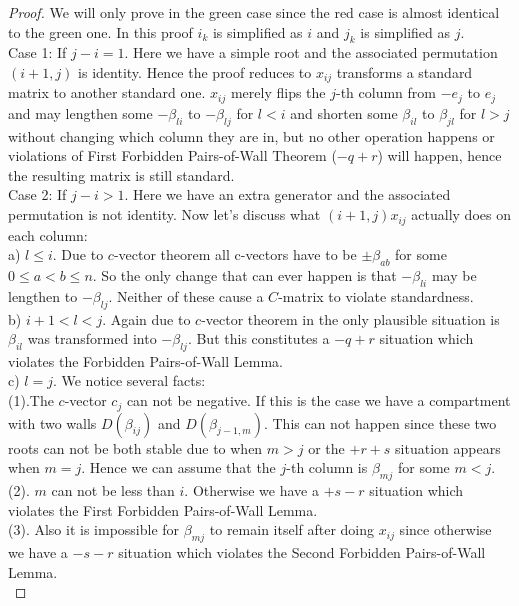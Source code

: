\begin{proof}
\indent We will only prove in the green case since the red case is almost identical to the green one. In this proof $i_k$ is simplified as $i$ and $j_k$ is simplified as $j$.\\
\indent Case 1: If $j - i  = 1$. Here we have a simple root and the associated permutation $(i+1,j)$ is identity. Hence the proof reduces to $x_{ij}$ transforms a standard matrix to another standard one. $x_{ij}$ merely flips the $j$-th column from $-e_j$ to $e_j$ and may lengthen some $-\beta_{li}$ to $-\beta_{lj}$ for $l<i$ and shorten some $\beta_{il}$ to $\beta_{jl}$ for $l>j$ without changing which column they are in, but no other operation happens or violations of First Forbidden Pairs-of-Wall Theorem ($-q+r$) will happen, hence the resulting matrix is still standard.\\
\indent Case 2: If $j - i > 1$. Here we have an extra generator and the associated permutation is not identity. Now let's discuss what $(i+1,j) x_{ij}$ actually does on each column:\\
\indent a) $l\leq i$. Due to $c$-vector theorem \cite{IOTW15} all c-vectors have to be $\pm\beta_{ab}$ for some $0\leq a<b\leq n$. So the only change that can ever happen is that $-\beta_{li}$ may be lengthen to $-\beta_{lj}$. Neither of these cause a $C$-matrix to violate standardness.\\
\indent b) $i + 1 < l < j$. Again due to $c$-vector theorem in \cite{IOTW15} the only plausible situation is $\beta_{il}$ was transformed into $-\beta_{lj}$. But this constitutes a $-q+r$ situation which violates the Forbidden Pairs-of-Wall Lemma.\\
\indent c) $l = j$. We notice several facts:\\
\indent (1).The $c$-vector $c_j$ can not be negative. If this is the case we have a compartment with two walls $D(\beta_{ij})$ and $D(\beta_{j-1,m})$. This can not happen since these two roots can not be both stable due to \cite{ST12} when $m>j$ or the $+r+s$ situation appears when $m=j$. Hence we can assume that the $j$-th column is $\beta_{mj}$ for some $m<j$.\\
\indent (2). $m$ can not be less than $i$. Otherwise we have a $+s-r$ situation which violates the First Forbidden Pairs-of-Wall Lemma.\\
\indent (3). Also it is impossible for $\beta_{mj}$ to remain itself after doing $x_{ij}$ since otherwise we have a $-s-r$ situation which violates the Second Forbidden Pairs-of-Wall Lemma.\\

\end{proof}
